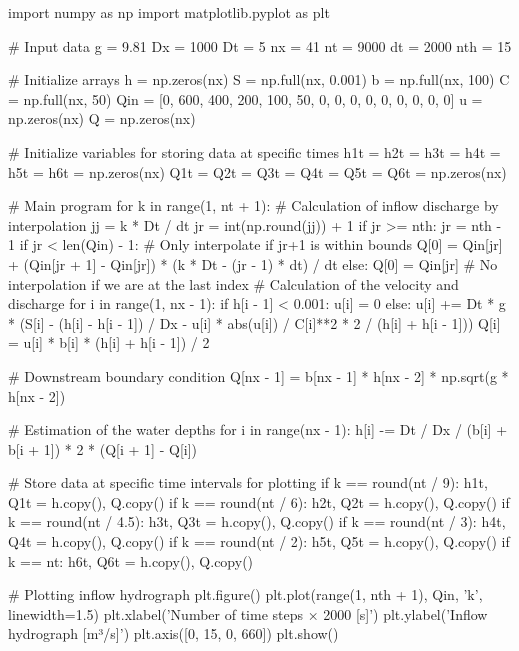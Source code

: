\documentclass{article}
\begin{document}
\begin{ColoredVerbatim}[formatcom=\color{red}]

    import numpy as np
    import matplotlib.pyplot as plt
    
    # Input data
    g = 9.81
    Dx = 1000
    Dt = 5
    nx = 41
    nt = 9000
    dt = 2000
    nth = 15
    
    # Initialize arrays
    h = np.zeros(nx)
    S = np.full(nx, 0.001)
    b = np.full(nx, 100)
    C = np.full(nx, 50)
    Qin = [0, 600, 400, 200, 100, 50, 0, 0, 0, 0, 0, 0, 0, 0, 0]
    u = np.zeros(nx)
    Q = np.zeros(nx)
    
    # Initialize variables for storing data at specific times
    h1t = h2t = h3t = h4t = h5t = h6t = np.zeros(nx)
    Q1t = Q2t = Q3t = Q4t = Q5t = Q6t = np.zeros(nx)
    
    # Main program
    for k in range(1, nt + 1):
        # Calculation of inflow discharge by interpolation
        jj = k * Dt / dt
        jr = int(np.round(jj)) + 1
        if jr >= nth:
            jr = nth - 1
        if jr < len(Qin) - 1:  # Only interpolate if jr+1 is within bounds
            Q[0] = Qin[jr] + (Qin[jr + 1] - Qin[jr]) * (k * Dt - (jr - 1) * dt) / dt
        else:
            Q[0] = Qin[jr]  # No interpolation if we are at the last index
        # Calculation of the velocity and discharge
        for i in range(1, nx - 1):
            if h[i - 1] < 0.001:
                u[i] = 0
            else:
                u[i] += Dt * g * (S[i] - (h[i] - h[i - 1]) / Dx - u[i] * abs(u[i]) / C[i]**2 * 2 / (h[i] + h[i - 1]))
                Q[i] = u[i] * b[i] * (h[i] + h[i - 1]) / 2
    
        # Downstream boundary condition
        Q[nx - 1] = b[nx - 1] * h[nx - 2] * np.sqrt(g * h[nx - 2])
    
        # Estimation of the water depths
        for i in range(nx - 1):
            h[i] -= Dt / Dx / (b[i] + b[i + 1]) * 2 * (Q[i + 1] - Q[i])
    
        # Store data at specific time intervals for plotting
        if k == round(nt / 9):
            h1t, Q1t = h.copy(), Q.copy()
        if k == round(nt / 6):
            h2t, Q2t = h.copy(), Q.copy()
        if k == round(nt / 4.5):
            h3t, Q3t = h.copy(), Q.copy()
        if k == round(nt / 3):
            h4t, Q4t = h.copy(), Q.copy()
        if k == round(nt / 2):
            h5t, Q5t = h.copy(), Q.copy()
        if k == nt:
            h6t, Q6t = h.copy(), Q.copy()
    
    # Plotting inflow hydrograph
    plt.figure()
    plt.plot(range(1, nth + 1), Qin, 'k', linewidth=1.5)
    plt.xlabel('Number of time steps × 2000 [s]')
    plt.ylabel('Inflow hydrograph [m³/s]')
    plt.axis([0, 15, 0, 660])
    plt.show()
    

\end{ColoredVerbatim}
\end{document}
